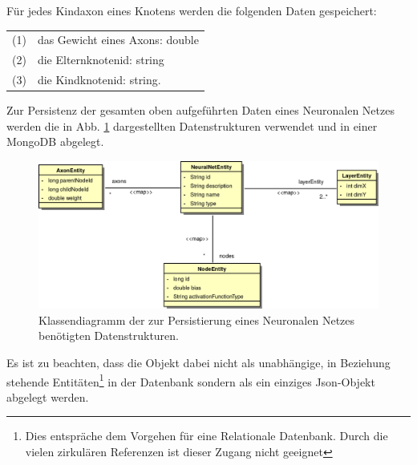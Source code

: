 Für jedes Kindaxon eines Knotens werden die folgenden Daten gespeichert: 

\begin{tabular}{cl}
(1) & das Gewicht eines Axons: double \\[0.2cm]
(2) & die Elternknotenid: string \\[0.2cm]
(3) & die Kindknotenid: string. \\[0.2cm]
\end{tabular}

Zur Persistenz der gesamten oben aufgeführten Daten eines Neuronalen Netzes werden die in Abb. \ref{fig_dbClassdiagram} dargestellten Datenstrukturen verwendet und in einer MongoDB abgelegt. 
\begin{figure}[h]
\begin{center}
\includegraphics[width=\textwidth]{Abbildungen/UML/jan/datenBankKlassendiagramm.png}
\caption{Klassendiagramm der zur Persistierung eines Neuronalen Netzes benötigten Datenstrukturen.}
\label{fig_dbClassdiagram}
\end{center}
\end{figure}
Es ist zu beachten, dass die Objekt dabei nicht als unabhängige, in Beziehung stehende Entitäten\footnote{Dies entspräche dem Vorgehen für eine Relationale Datenbank. Durch die vielen zirkulären Referenzen ist dieser Zugang nicht geeignet} in der Datenbank sondern als ein einziges Json-Objekt abgelegt werden. 
